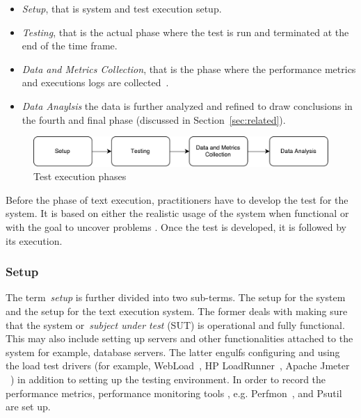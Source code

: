 \begin{itemize}
	\item \textit{Setup}, that is system and test execution setup.
	\item \textit{Testing}, that is the actual phase where the test is run and terminated at the end of the time frame.
	\item \textit{Data and Metrics Collection}, that is the phase where the performance metrics and executions logs are collected~\cite{jiang2015survey}.
	\item \textit{Data Anaylsis} the data is further analyzed and refined to draw conclusions in the fourth and final phase (discussed in Section~\ref{sec:related}).	
\end{itemize}
 


\begin{figure}[thb!]
	\centering
	\includegraphics[width=1\textwidth]{figures/test_overview.pdf}
	\caption{Test execution phases}
	\label{fig:test_phases}
\end{figure}


Before the phase of text execution, practitioners have to develop the test for the system. It is based on either the realistic usage of the system when functional or with the goal to uncover problems \cite{jiang2015survey}.
Once the test is developed, it is followed by its execution. 



\subsubsection{Setup}


The term~\textit{setup} is further divided into two sub-terms. The setup for the system and the setup for the text execution system. The former deals with making sure that the system or~\textit{subject under test} (SUT) is operational and fully functional. This may also include setting up servers and other functionalities attached to the system for example, database servers. The latter engulfs configuring and using the load test drivers (for example, WebLoad~\cite{webload}, HP LoadRunner~\cite{loadrunner}, Apache Jmeter ~\cite{apachejmeter}) in addition to setting up the testing environment. In order to record the performance metrics, performance monitoring tools , e.g. Perfmon~\cite{perfmon}, and Psutil~\cite{psutil} are set up.

